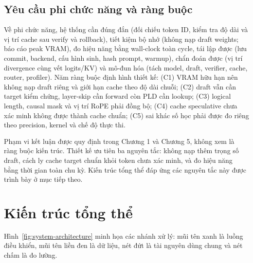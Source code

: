 \subsection{Yêu cầu phi chức năng và ràng buộc}
Về phi chức năng, hệ thống cần đúng đắn (đối chiếu token ID, kiểm tra độ dài và vị trí cache sau verify và rollback), tiết kiệm bộ nhớ (không nạp draft weights; báo cáo peak VRAM), đo hiệu năng bằng wall-clock toàn cycle, tái lập được (lưu commit, backend, cấu hình sinh, hash prompt, warmup), chẩn đoán được (vị trí divergence cùng vết logits/KV) và mô-đun hóa (tách model, draft, verifier, cache, router, profiler). Năm ràng buộc định hình thiết kế: (C1) VRAM hữu hạn nên không nạp draft riêng và giới hạn cache theo độ dài chuỗi; (C2) draft vẫn cần target kiểm chứng, layer-skip cần forward còn PLD cần lookup; (C3) logical length, causal mask và vị trí RoPE phải đồng bộ; (C4) cache speculative chưa xác minh không được thành cache chuẩn; (C5) sai khác số học phải được đo riêng theo precision, kernel và chế độ thực thi.

Phạm vi kết luận được quy định trong Chương 1 và Chương 5, không xem là ràng buộc kiến trúc. Thiết kế ưu tiên ba nguyên tắc: không nạp thêm trọng số draft, cách ly cache target chuẩn khỏi token chưa xác minh, và đo hiệu năng bằng thời gian toàn chu kỳ. Kiến trúc tổng thể đáp ứng các nguyên tắc này được trình bày ở mục tiếp theo.

\section{Kiến trúc tổng thể}
\noindent Hình~\ref{fig:system-architecture} minh họa các nhánh xử lý: mũi tên xanh là luồng điều khiển, mũi tên liền đen là dữ liệu, nét đứt là tài nguyên dùng chung và nét chấm là đo lường.

